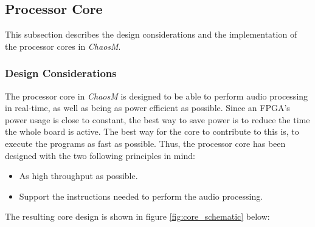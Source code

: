 
\FloatBarrier
\subsection{Processor Core}\label{subsec:fpga-processor-core}

This subsection describes the design considerations and the implementation of the
 processor cores in \textit{ChaosM}.

\subsubsection{Design Considerations}

The processor core in \textit{ChaosM} is designed to be able to perform audio processing in real-time, as well as being as power efficient as possible.
Since an FPGA's power usage is close to constant, the best way to save power is to reduce the time the whole board is active.
The best way for the core to contribute to this is, to execute the programs as fast as possible.
Thus, the processor core has been designed with the two following principles in mind:

\begin{itemize}
	\item As high throughput as possible.
	\item Support the instructions needed to perform the audio processing.
\end{itemize}
The resulting core design is shown in figure \ref{fig:core_schematic} below:

